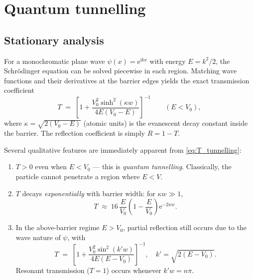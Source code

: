 \documentclass[12pt, a4paper]{article}
\newcommand{\ii}{\mathrm{i}}          %
\newcommand{\ee}{\mathrm{e}}          %
\begin{document}
\section{Quantum tunnelling}
\label{sec:tunnelling}

\subsection{Stationary analysis}

For a monochromatic plane wave $\psi(x) = \ee^{\ii kx}$ with energy
$E = k^2/2$, the Schr\"{o}dinger equation can be solved piecewise in
each region.  Matching wave functions and their derivatives at the
barrier edges yields the exact transmission coefficient \cite{Griffiths2018}
\begin{equation}
  T \;=\; \left[1 + \frac{V_0^2\sinh^2(\kappa w)}{4E(V_0-E)}\right]^{-1}
  \qquad (E < V_0),
  \label{eq:T_tunnelling}
\end{equation}
where $\kappa = \sqrt{2(V_0-E)}$ (atomic units) is the evanescent decay
constant inside the barrier.  The reflection coefficient is simply
$R = 1 - T$.

Several qualitative features are immediately apparent from
\eqref{eq:T_tunnelling}:
\begin{enumerate}
  \item $T > 0$ even when $E < V_0$ — this is \emph{quantum tunnelling}.
        Classically, the particle cannot penetrate a region where $E < V$.
  \item $T$ decays \emph{exponentially} with barrier width: for
        $\kappa w \gg 1$,
        \begin{equation}
          T \;\approx\; 16\,\frac{E}{V_0}\!\left(1 - \frac{E}{V_0}\right)
          \ee^{-2\kappa w}.
        \end{equation}
  \item In the above-barrier regime $E > V_0$, partial reflection still
        occurs due to the wave nature of $\psi$, with
        \begin{equation}
          T \;=\; \left[1 + \frac{V_0^2\sin^2(k' w)}{4E(E-V_0)}\right]^{-1},
          \quad k' = \sqrt{2(E-V_0)}.
        \end{equation}
        Resonant transmission ($T = 1$) occurs whenever $k'w = n\pi$.
\end{enumerate}
\end{document}
